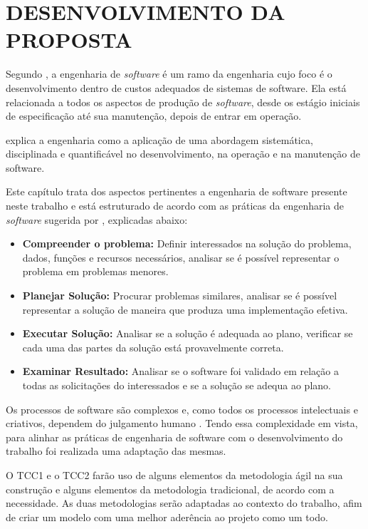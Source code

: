 
\chapter[Desenvolvimento da Proposta]{DESENVOLVIMENTO DA PROPOSTA}


Segundo \cite{sommerville2003engenharia} , a  engenharia de \textit{software} é um ramo da engenharia cujo foco é o desenvolvimento dentro de custos adequados de sistemas de software. Ela está relacionada a todos os aspectos de produção de \textit{software}, desde os estágio iniciais de especificação até sua manutenção, depois de entrar em operação. 

\cite{pressman2009engenharia} explica a engenharia como a aplicação de uma abordagem sistemática, disciplinada e quantificável no desenvolvimento, na operação e na manutenção de software.

Este capítulo trata dos aspectos pertinentes a engenharia de software presente neste trabalho e está estruturado de acordo com as práticas da engenharia de \textit{software} sugerida por \cite{pressman2009engenharia}, explicadas abaixo:

\begin{itemize}
\item  \textbf {Compreender o problema:} Definir interessados na solução do problema, dados, funções e recursos necessários, analisar se é possível representar o problema em problemas menores.
\item  \textbf {Planejar Solução:} Procurar problemas similares, analisar se é possível representar a solução de maneira que produza uma implementação efetiva. 
\item  \textbf {Executar Solução:} Analisar se a solução é adequada ao plano, verificar se cada uma das partes da solução está provavelmente correta. 
\item  \textbf {Examinar Resultado:} Analisar se o software foi validado em relação a todas as solicitações do interessados e se a solução se adequa ao plano.
\end{itemize}


 Os processos de software são complexos e, como todos os processos intelectuais e criativos, dependem do julgamento humano \cite{sommerville2003engenharia}. Tendo essa complexidade em vista, para alinhar as práticas de engenharia de software com o desenvolvimento do trabalho foi realizada uma adaptação das  mesmas.

 O TCC1 e o TCC2 farão uso de alguns elementos da metodologia ágil na sua construção e alguns elementos da metodologia tradicional, de acordo com a necessidade. As duas metodologias serão adaptadas ao contexto do trabalho, afim de criar um modelo com uma melhor aderência ao projeto como um todo.

